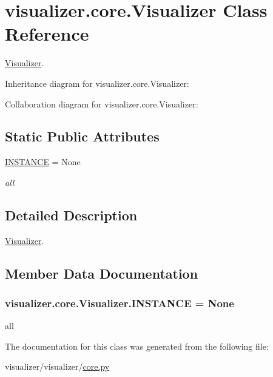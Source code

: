 \hypertarget{classvisualizer_1_1core_1_1Visualizer}{}\section{visualizer.\+core.\+Visualizer Class Reference}
\label{classvisualizer_1_1core_1_1Visualizer}


\hyperlink{classvisualizer_1_1core_1_1Visualizer}{Visualizer}.  




Inheritance diagram for visualizer.\+core.\+Visualizer\+:


Collaboration diagram for visualizer.\+core.\+Visualizer\+:
\subsection*{Static Public Attributes}
\begin{DoxyCompactItemize}
\item 
\hyperlink{classvisualizer_1_1core_1_1Visualizer_a324c9b8464998ff020f4591768788e97}{I\+N\+S\+T\+A\+N\+CE} = None
\begin{DoxyCompactList}\small\item\em all \end{DoxyCompactList}\end{DoxyCompactItemize}


\subsection{Detailed Description}
\hyperlink{classvisualizer_1_1core_1_1Visualizer}{Visualizer}. 

\subsection{Member Data Documentation}
\subsubsection[{\texorpdfstring{I\+N\+S\+T\+A\+N\+CE}{INSTANCE}}]{\setlength{\rightskip}{0pt plus 5cm}visualizer.\+core.\+Visualizer.\+I\+N\+S\+T\+A\+N\+CE = None\hspace{0.3cm}{\ttfamily [static]}}\hypertarget{classvisualizer_1_1core_1_1Visualizer_a324c9b8464998ff020f4591768788e97}{}\label{classvisualizer_1_1core_1_1Visualizer_a324c9b8464998ff020f4591768788e97}


all 



The documentation for this class was generated from the following file\+:\begin{DoxyCompactItemize}
\item 
visualizer/visualizer/\hyperlink{visualizer_2visualizer_2core_8py}{core.\+py}\end{DoxyCompactItemize}
